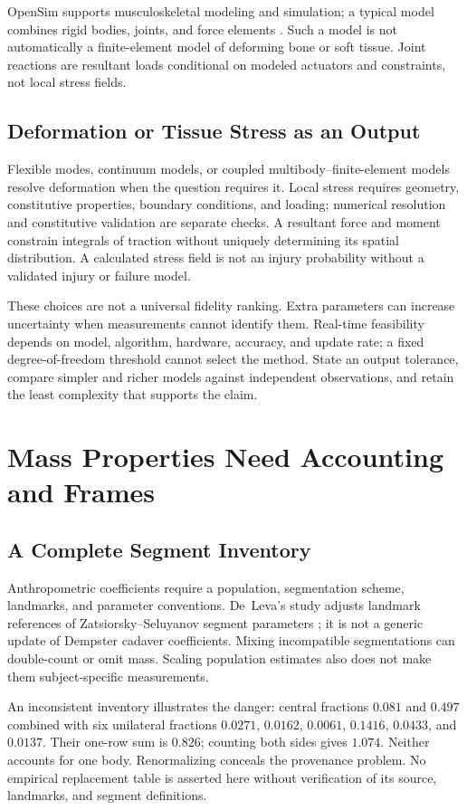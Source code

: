 OpenSim supports musculoskeletal modeling and simulation; a typical model
combines rigid bodies, joints, and force elements \cite{Delp2007}. Such a
model is not automatically a finite-element model of deforming bone or soft
tissue. Joint reactions are resultant loads conditional on modeled actuators
and constraints, not local stress fields.

\subsection{Deformation or Tissue Stress as an Output}

Flexible modes, continuum models, or coupled multibody--finite-element models
resolve deformation when the question requires it. Local stress requires
geometry, constitutive properties, boundary conditions, and loading; numerical
resolution and constitutive validation are separate checks. A resultant force
and moment constrain integrals of traction without uniquely determining its
spatial distribution. A calculated stress field is not an injury probability
without a validated injury or failure model.

These choices are not a universal fidelity ranking. Extra parameters can
increase uncertainty when measurements cannot identify them. Real-time
feasibility depends on model, algorithm, hardware, accuracy, and update rate;
a fixed degree-of-freedom threshold cannot select the method. State an output
tolerance, compare simpler and richer models against independent observations,
and retain the least complexity that supports the claim.

\section{Mass Properties Need Accounting and Frames}
\subsection{A Complete Segment Inventory}

Anthropometric coefficients require a population, segmentation scheme,
landmarks, and parameter conventions. De~Leva's study adjusts landmark
references of Zatsiorsky--Seluyanov segment parameters \cite{deLeva1996};
it is not a generic update of Dempster cadaver coefficients. Mixing
incompatible segmentations can double-count or omit mass. Scaling population
estimates also does not make them subject-specific measurements.

An inconsistent inventory illustrates the danger: central fractions $0.081$
and $0.497$ combined with six
unilateral fractions $0.0271$, $0.0162$, $0.0061$, $0.1416$, $0.0433$, and
$0.0137$. Their one-row sum is $0.826$; counting both sides gives $1.074$.
Neither accounts for one body. Renormalizing conceals the provenance problem.
No empirical replacement table is asserted here without verification of its
source, landmarks, and segment definitions.

